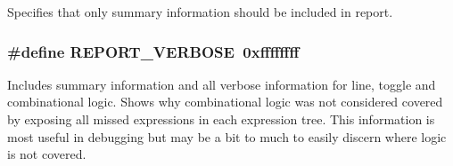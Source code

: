 Specifies that only summary information should be included in report. 
\subsubsection{\setlength{\rightskip}{0pt plus 5cm}\#define REPORT\_\-VERBOSE\ 0xffffffff}\label{group__report__detail_a2}


Includes summary information and all verbose information for line, toggle and combinational logic. Shows why combinational logic was not considered covered by exposing all missed expressions in each expression tree. This information is most useful in debugging but may be a bit to much to easily discern where logic is not covered. 